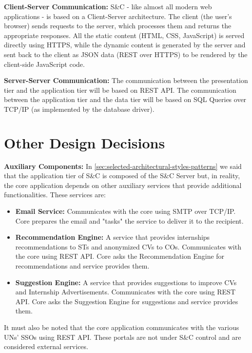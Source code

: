 \par{\textbf{Client-Server Communication:}} S\&C - like almost all modern web applications - is based on a
Client-Server architecture. The client (the user's browser) sends requests to the server, which processes them and
returns the appropriate responses. All the static content (HTML, CSS, JavaScript) is served directly using HTTPS, while
the dynamic content is generated by the server and sent back to the client as JSON data (REST over HTTPS) to be
rendered by the client-side JavaScript code.

\par{\textbf{Server-Server Communication:}} The communication between the presentation tier and the application tier
will be based on REST API. The communication between the application tier and the data tier will be based on SQL
Queries over TCP/IP (as implemented by the database driver).

\section{Other Design Decisions}
\label{sec:other-design-decisions}%

\par{\textbf{Auxiliary Components:}} In \ref{sec:selected-architectural-styles-patterns} we said that the application
tier of S\&C is composed of the S\&C Server but, in reality, the core application depends on other auxiliary services
that provide additional functionalities. These services are:

\begin{itemize}
      \item \textbf{Email Service:} Communicates with the core using SMTP over TCP/IP. Core prepares the email and
            "tasks" the service to deliver it to the recipient.
      \item \textbf{Recommendation Engine:} A service that provides internships recommendations to STs and anonymized
            CVs to COs. Communicates with the core using REST API. Core asks the Recommendation Engine for
            recommendations and service provides them.
      \item \textbf{Suggestion Engine:} A service that provides suggestions to improve CVs and Internship
            Advertisements. Communicates with the core using REST API. Core asks the Suggestion Engine for suggestions
            and service provides them.
\end{itemize}

It must also be noted that the core application communicates with the various UNs' SSOs using REST API. These portals
are not under S\&C control and are considered external services.

